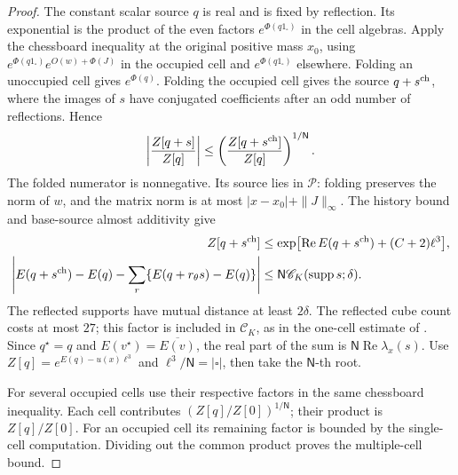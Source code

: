 \documentclass[11pt,letterpaper,reqno]{amsart}
\theoremstyle{definition}
\theoremstyle{remark}
\begin{document}
\begin{proof}
The constant scalar source \(q\) is real and is fixed by
reflection. Its exponential is the product of the even
factors \(e^{\Phi(q1_\square)}\) in the cell algebras.
Apply the chessboard inequality at the original positive
mass \(x_0\), using
\(e^{\Phi(q1_\square)}e^{O(w)+\Phi(J)}\) in the occupied
cell and \(e^{\Phi(q1_\square)}\) elsewhere.
Folding an unoccupied cell gives \(e^{\Phi(q)}\).
Folding the occupied cell gives the source \(q+s^{\rm ch}\),
where the images of \(s\) have conjugated coefficients after
an odd number of reflections. Hence
\[
 \left|\frac{Z[q+s]}{Z[q]}\right|
       \le\left(\frac{Z[q+s^{\rm ch}]}{Z[q]}\right)^{1/\mathsf N}.
\]
The folded numerator is nonnegative. Its source lies in
\(\mathcal P\): folding preserves the norm of \(w\), and
the matrix norm is at most \(|x-x_0|+\|J\|_\infty\).
The history bound and base-source almost additivity give
\[
 \begin{split}
 Z[q+s^{\rm ch}]
 &\le \exp\bigl[\operatorname{Re}E(q+s^{\rm ch})
                                      +(C+2)\ell^3\bigr],\\
 \left|E(q+s^{\rm ch})-E(q)
       -\sum_r\{E(q+r_\theta s)-E(q)\}\right|
 &\le\mathsf N\mathscr C_K(\operatorname{supp}s;\delta).
 \end{split}
\]
The reflected supports have mutual distance at least
\(2\delta\). The reflected cube count costs at most \(27\);
this factor is included in \(\mathscr C_K\), as in the
one-cell estimate of \cite[Prop. 10.17]{QCDM1}.
Since \(q^\star=q\) and
\(E(v^\star)=\overline{E(v)}\), the real part of the sum
is \(\mathsf N\operatorname{Re}\lambda_x(s)\).
Use \(Z[q]=e^{E(q)-u(x)\ell^3}\) and
\(\ell^3/\mathsf N=|\square|\), then take the
\(\mathsf N\)-th root.

For several occupied cells use their respective factors in
the same chessboard inequality. Each cell contributes
\((Z[q]/Z[0])^{1/\mathsf N}\); their product is
\(Z[q]/Z[0]\). For an occupied cell its remaining factor
is bounded by the single-cell computation. Dividing out
the common product proves the multiple-cell bound.
\end{proof}
\end{document}

